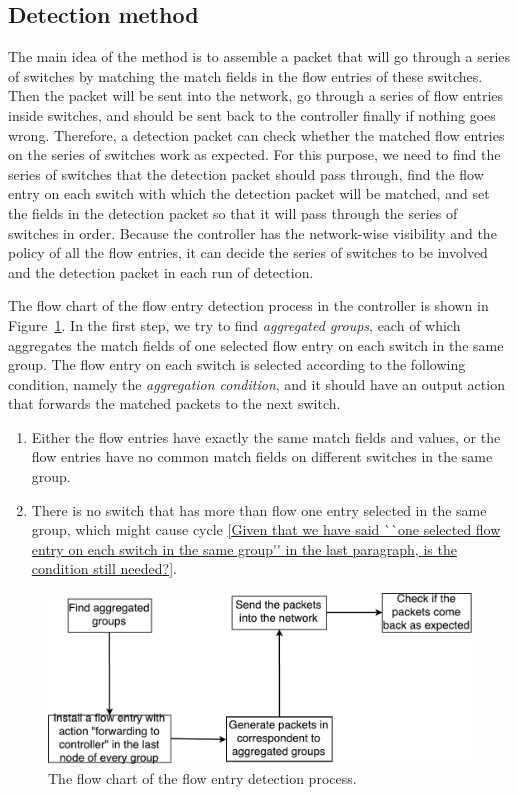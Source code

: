 \subsection{Detection method}
\label{Detection_method}
The main idea of the method is to assemble a packet that will go through a series of switches by matching the match fields in the flow entries of these switches. Then the packet will be sent into the network, go through a series of flow entries inside switches, and should be sent back to the controller finally if nothing goes wrong. Therefore, a detection packet can check whether the matched flow entries on the series of switches work as expected. For this purpose, we need to find the series of switches that the detection packet should pass through, find the flow entry on each switch with which the detection packet will be matched, and set the fields in the detection packet so that it will pass through the series of switches in order.  Because the controller has the network-wise visibility and the policy of all the flow entries, it can decide the series of switches to be involved and the detection packet in each run of detection.   

The flow chart of the flow entry detection process in the controller is shown in Figure~\ref{flow_entry_detection_flowchart}. In the first step, we try to find \textit{aggregated groups}, each of which aggregates the match fields of one selected flow entry on each switch in the same group. The flow entry on each switch is selected according to the following condition, namely the \textit{aggregation condition}, and it should have an output action that forwards the matched packets to the next switch.

\begin{enumerate}
\item
Either the flow entries have exactly the same match fields and values, or the flow entries have no common match fields on different switches in the same group.
\item
There is no switch that has more than flow one entry selected in the same group, which might cause cycle \ref{Given that we have said ``one selected flow entry on each switch in the same group'' in the last paragraph, is the condition still needed?}.
\end{enumerate}

\begin{figure}[H]
\begin{center} 
\includegraphics[width=1\textwidth]{figures/flow_entry_detection_flowchart.pdf}
\end{center}
\caption{The flow chart of the flow entry detection process.}
\label{flow_entry_detection_flowchart}
\end{figure}

